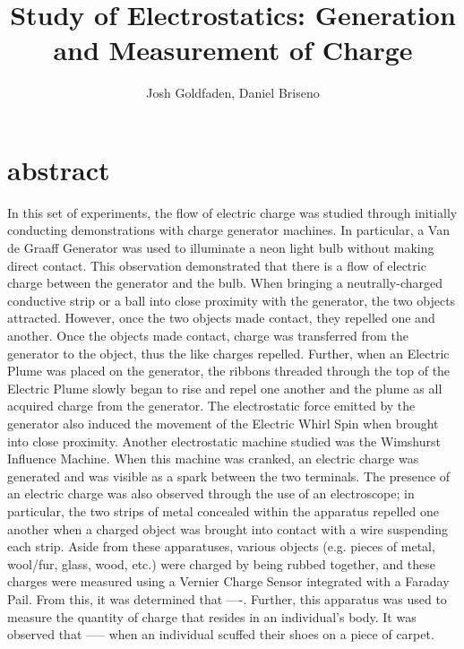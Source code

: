 \documentclass[12pt]{amsart}
\title{Study of Electrostatics: Generation and Measurement of Charge}
\author{Josh Goldfaden, Daniel Briseno}
\date{}
\begin{document}
\maketitle
\section{abstract}
In this set of experiments, the flow of electric charge was studied through initially conducting demonstrations with charge generator machines. In particular, a Van de Graaff Generator was used to illuminate a neon light bulb without making direct contact. This observation demonstrated that there is a flow of electric charge between the generator and the bulb. When bringing a neutrally-charged conductive strip or a ball into close proximity with the generator, the two objects attracted. However, once the two objects made contact, they repelled one and another. Once the objects made contact, charge was transferred from the generator to the object, thus the like charges repelled. Further, when an Electric Plume was placed on the generator, the ribbons threaded through the top of the Electric Plume slowly began to rise and repel one another and the plume as all acquired charge from the generator. The electrostatic force emitted by the generator also induced the movement of the Electric Whirl Spin when brought into close proximity. Another electrostatic machine studied was the Wimshurst Influence Machine. When this machine was cranked, an electric charge was generated and was visible as a spark between the two terminals. The presence of an electric charge was also observed through the use of an electroscope; in particular, the two strips of metal concealed within the apparatus repelled one another when a charged object was brought into contact with a wire suspending each strip. Aside from these apparatuses, various objects (e.g. pieces of metal, wool/fur, glass, wood, etc.) were charged by being rubbed together, and these charges were measured using a Vernier Charge Sensor integrated with a Faraday Pail. From this, it was determined that ----. Further, this apparatus was used to measure the quantity of charge that resides in an individual’s body. It was observed that ----- when an individual scuffed their shoes on a piece of carpet.
 
\end{document}
